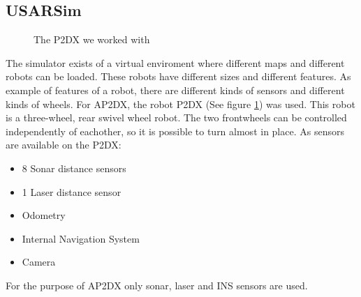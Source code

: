 \documentclass[titlepage, a4paper,10pt]{article}
\begin{document}
\subsection{USARSim}
\begin{figure}
  \centering
  \caption{The P2DX we worked with}
  \label{fig:p2dx}
\end{figure}
The simulator exists of a virtual enviroment where different maps and different
robots can be loaded. These robots have different sizes and different features.
As example of features of a robot, there are different kinds of sensors and
different kinds of wheels. For AP2DX, the robot P2DX (See figure \ref{fig:p2dx}) was used. This robot is a three-wheel, rear swivel wheel robot. The two frontwheels can be controlled independently of eachother, so it is possible to turn almost in place. As sensors are available on the P2DX:
\begin{itemize}
\item 8 Sonar distance sensors
\item 1 Laser distance sensor
\item Odometry
\item Internal Navigation System
\item Camera
\end{itemize}
For the purpose of AP2DX only sonar, laser and INS sensors are used.
\end{document}
